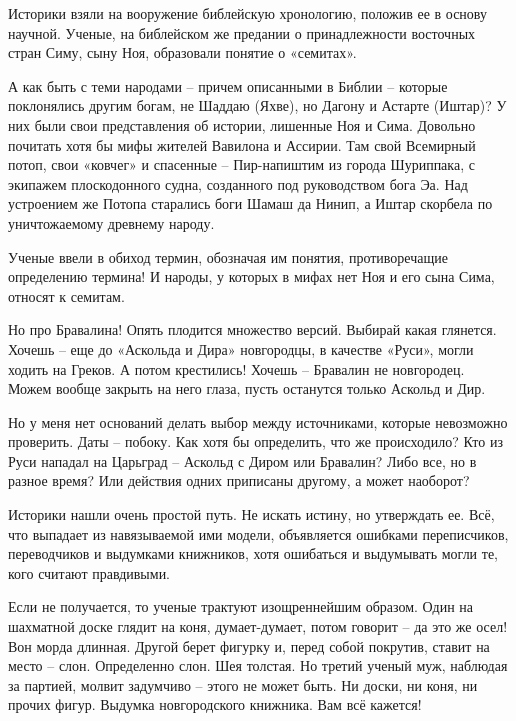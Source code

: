Историки взяли на вооружение библейскую хронологию, положив ее в основу научной. Ученые, на библейском же предании о принадлежности восточных стран Симу, сыну Ноя, образовали понятие о «семитах». 

А как быть с теми народами – причем описанными в Библии – которые поклонялись другим богам, не Шаддаю (Яхве), но Дагону и Астарте (Иштар)? У них были свои представления об истории, лишенные Ноя и Сима. Довольно почитать хотя бы мифы жителей Вавилона и Ассирии. Там свой Всемирный потоп, свои «ковчег» и спасенные – Пир-напиштим из города Шуриппака, с экипажем плоскодонного судна, созданного под руководством бога Эа. Над устроением же Потопа старались боги Шамаш да Нинип, а Иштар скорбела по уничтожаемому древнему народу.

Ученые ввели в обиход термин, обозначая им понятия, противоречащие определению термина! И народы, у которых в мифах нет Ноя и его сына Сима, относят к семитам.

Но про Бравалина! Опять плодится множество версий. Выбирай какая глянется. Хочешь – еще до «Аскольда и Дира» новгородцы, в качестве «Руси», могли ходить на Греков. А потом крестились! Хочешь – Бравалин не новгородец. Можем вообще закрыть на него глаза, пусть останутся только Аскольд и Дир.

Но у меня нет оснований делать выбор между источниками, которые невозможно проверить. Даты – побоку. Как хотя бы определить, что же происходило? Кто из Руси нападал на Царьград – Аскольд с Диром или Бравалин? Либо все, но в разное время? Или действия одних приписаны другому, а может наоборот?

Историки нашли очень простой путь. Не искать истину, но утверждать ее. Всё, что выпадает из навязываемой ими модели, объявляется ошибками переписчиков, переводчиков и выдумками книжников, хотя ошибаться и выдумывать могли те, кого считают правдивыми.

Если не получается, то ученые трактуют изощреннейшим образом. Один на шахматной доске глядит на коня, думает-думает, потом говорит – да это же осел! Вон морда длинная. Другой берет фигурку и, перед собой покрутив, ставит на место – слон. Определенно слон. Шея толстая. Но третий ученый муж, наблюдая за партией, молвит задумчиво – этого не может быть. Ни доски, ни коня, ни прочих фигур. Выдумка новгородского книжника. Вам всё кажется!
